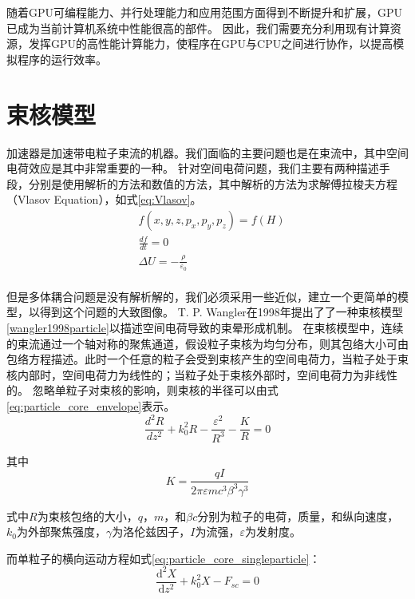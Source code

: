 随着GPU可编程能力、并行处理能力和应用范围方面得到不断提升和扩展，GPU已成为当前计算机系统中性能很高的部件。
因此，我们需要充分利用现有计算资源，发挥GPU的高性能计算能力，使程序在GPU与CPU之间进行协作，以提高模拟程序的运行效率。



\section{束核模型}
加速器是加速带电粒子束流的机器。我们面临的主要问题也是在束流中，其中空间电荷效应是其中非常重要的一种。
针对空间电荷问题，我们主要有两种描述手段，分别是使用解析的方法和数值的方法，其中解析的方法为求解傅拉梭夫方程（Vlasov Equation），如式\ref{eq:Vlasov}。
\begin{equation}
    \label{eq:Vlasov}
    \begin{aligned}
        & f(x,y,z,{{p}_{x}},{{p}_{y}},{{p}_{z}})=f(H) \\
        & \frac{df}{dt}=0 \\
        & \Delta U=-\frac{\rho }{{{\varepsilon }_{0}}} \\
    \end{aligned}
\end{equation}

但是多体耦合问题是没有解析解的，我们必须采用一些近似，建立一个更简单的模型，以得到这个问题的大致图像。
T. P. Wangler在1998年提出了了一种束核模型\ref{wangler1998particle}以描述空间电荷导致的束晕形成机制。
在束核模型中，连续的束流通过一个轴对称的聚焦通道，假设粒子束核为均匀分布，则其包络大小可由包络方程描述。此时一个任意的粒子会受到束核产生的空间电荷力，当粒子处于束核内部时，空间电荷力为线性的；当粒子处于束核外部时，空间电荷力为非线性的。
忽略单粒子对束核的影响，则束核的半径可以由式\ref{eq:particle_core_envelope}表示。
\begin{equation}
    \label{eq:particle_core_envelope}
    \frac{{{d}^{2}}R}{d{{z}^{2}}}+k_{0}^{2}R-\frac{{{\varepsilon }^{2}}}{{{R}^{3}}}-\frac{K}{R}=0
\end{equation}

其中
\begin{equation}
K=\frac{qI}{2\pi \varepsilon m{{c}^{3}}{{\beta }^{3}}{{\gamma }^{3}}}
\end{equation}

式中$R$为束核包络的大小，$q$，$m$，和$\beta c$分别为粒子的电荷，质量，和纵向速度，$k_{0}$为外部聚焦强度，$\gamma$为洛伦兹因子，$I$为流强，$\varepsilon$为发射度。

而单粒子的横向运动方程如式\ref{eq:particle_core_singleparticle}：
\begin{equation}
    \label{eq:particle_core_singleparticle}
    \frac{{{\text{d}}^{2}}X}{\text{d}{{z}^{2}}}+k_{0}^{2}X-{{F}_{sc}}=0
\end{equation}

